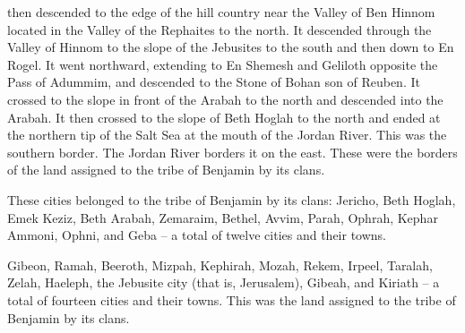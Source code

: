 {then descended
to
the edge
of the hill country
near
the Valley
of Ben Hinnom
located
in the Valley
of the Rephaites
to the north.
It descended
through the Valley
of Hinnom
to
the slope
of the Jebusites
to the south
and then down
to En Rogel.
It went
northward,
extending
to En Shemesh
and Geliloth
opposite
the Pass
of Adummim,
and descended
to the Stone
of Bohan
son
of Reuben.
It crossed
to
the slope
in front
of the Arabah
to the north
and descended
into the Arabah.
It then crossed
to
the slope
of Beth Hoglah
to the north
and ended
at
the northern
tip
of the Salt
Sea
at
the mouth
of the Jordan
River. This
was the southern
border.
The Jordan River
borders
it on
the east.
These
were the borders
of the land assigned
to the tribe of
Benjamin
by its clans.
\par }{\PP {}These cities
belonged to the tribe
of Benjamin
by its clans: Jericho,
Beth Hoglah,
Emek
Keziz,
Beth Arabah,
Zemaraim,
Bethel,
Avvim,
Parah,
Ophrah,
Kephar Ammoni,
Ophni,
and Geba
– a total of twelve
cities
and their towns.
\par }{\PP {}Gibeon,
Ramah,
Beeroth,
Mizpah,
Kephirah,
Mozah,
Rekem,
Irpeel,
Taralah,
Zelah,
Haeleph,
the Jebusite
city (that
is, Jerusalem), Gibeah,
and Kiriath
– a total of fourteen
cities
and their towns.
This
was the land assigned
to the tribe
of Benjamin
by its clans.

}
